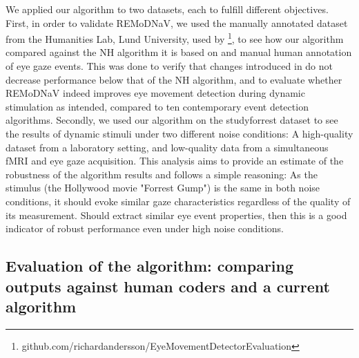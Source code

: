 We applied our algorithm to two datasets, each to fulfill different objectives. First, in order to validate REMoDNaV, we used the manually annotated dataset from the Humanities Lab, Lund University, used by \cite{Andersson2017}\footnote{github.com/richardandersson/EyeMovementDetectorEvaluation}, to see how our algorithm compared against the NH algorithm it is based on and manual human annotation of eye gaze events. This was done to verify that changes introduced in \remodnav do not decrease performance below that of the NH algorithm, and to evaluate whether REMoDNaV indeed improves eye movement detection during dynamic stimulation as intended, compared to ten contemporary event detection algorithms. Secondly, we used our algorithm on the studyforrest dataset \citep{Hanke2016} to see the results of dynamic stimuli under two different noise conditions: A high-quality dataset from a laboratory setting, and low-quality data from a simultaneous fMRI and eye gaze acquisition. This analysis aims to provide an estimate of the robustness of the algorithm results and follows a simple reasoning: As the stimulus (the Hollywood movie "Forrest Gump") is the same in both noise conditions, it should evoke similar gaze characteristics regardless of the quality of its measurement. Should \remodnav extract similar eye event properties, then this is a good indicator of robust performance even under high noise conditions.

\subsection*{Evaluation of the algorithm: comparing outputs against human coders and a current algorithm}\label{ana_1}

